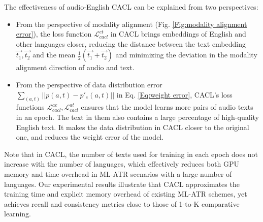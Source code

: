 


The effectiveness of audio-English CACL can be explained from two perspectives:
\begin{itemize}
    \item From the perspective of modality alignment (Fig. \ref{Fig:modality alignment error}), the loss function $\mathcal{L}^{et}_{cacl}$ in CACL brings embeddings of English and other languages closer, reducing the distance between the text embedding $\vec{t_1},\vec{t_2}$ and the mean $\frac{1}{2}(\vec{t_1}+\vec{t_2})$ and minimizing the deviation in the modality alignment direction of audio and text.
    \item From the perspective of data distribution error $\sum_{(a,t)}||p(a,t)-p'_e(a,t)||$ in Eq. \eqref{Eq:weight error}, CACL's loss functions $\mathcal L^{ae}_{cacl}, \mathcal L^{at}_{cacl}$ ensures that the model learns more pairs of audio texts in an epoch. The text in them also contains a large percentage of high-quality English text. It makes the data distribution in CACL closer to the original one, and reduces the weight error of the model.
\end{itemize}

Note that in CACL, the number of texts used for training in each epoch does not increase with the number of languages, which effectively reduces both GPU memory and time overhead in ML-ATR scenarios with a large number of languages. Our experimental results illustrate that CACL approximates the training time and explicit memory overhead of existing ML-ATR schemes, yet achieves recall and consistency metrics close to those of 1-to-K comparative learning.